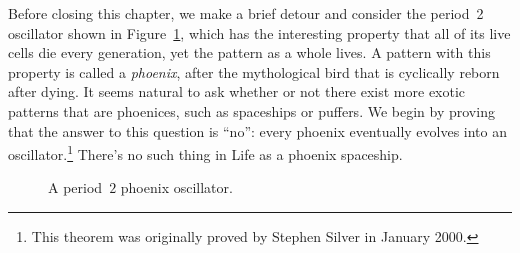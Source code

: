 Before closing this chapter, we make a brief detour and consider the period~2 oscillator shown in Figure~\ref{fig:phoenix}, which has the interesting property that all of its live cells die every generation, yet the pattern as a whole lives. A pattern with this property is called a \emph{phoenix}, after the mythological bird that is cyclically reborn after dying. It seems natural to ask whether or not there exist more exotic patterns that are phoenices, such as spaceships or puffers. We begin by proving that the answer to this question is ``no'': every phoenix eventually evolves into an oscillator.\footnote{This theorem was originally proved by Stephen Silver in January 2000.} There's no such thing in Life as a phoenix spaceship.

\begin{figure}[!htb]
	\centering
	\caption{A period~$2$ phoenix oscillator.}\label{fig:phoenix}
\end{figure}

